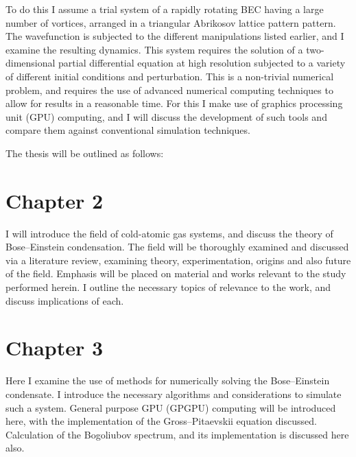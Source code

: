 To do this I assume a trial system of a rapidly rotating BEC having a large number of vortices, arranged in a triangular Abrikosov lattice pattern pattern. The wavefunction is subjected to the different manipulations listed earlier, and I examine the resulting dynamics. This system requires the solution of a two-dimensional partial differential equation at high resolution subjected to a variety of different initial conditions and perturbation. This is a non-trivial numerical problem, and requires the use of advanced numerical computing techniques to allow for results in a reasonable time. For this I make use of graphics processing unit (GPU) computing, and I will discuss the development of such tools and compare them against conventional simulation techniques.

The thesis will be outlined as follows:

\section{Chapter 2}
I will introduce the field of cold-atomic gas systems, and discuss the theory of Bose--Einstein condensation. The field will be thoroughly examined and discussed via a literature review, examining theory, experimentation, origins and also future of the field. Emphasis will be placed on material and works relevant to the study performed herein. I outline the necessary topics of relevance to the work, and discuss implications of each.

\iffalse
Introduction (~5-10 pages)

    - Thesis Statement (one or two sentences)
        What is your thesis about and what have you done?
        If you have a hypothesis what is it?
        How will you test (prove/disprove) your hypothesis?
    - Motivation
        Why is this problem you've worked on important
    - Goals / Objectives
        What are you trying to do and why?
        How will you or the reader know if or when you've met your objectives?
    - **** Contributions *****
        What is new, different, better, significant?
        Why is the world a better place because of what you've done?
        What have you contributed to the field of research?
        What is now known/possible/better because of your thesis?
    Outline of the thesis (optional)
\fi

\section{Chapter 3}
    Here I examine the use of methods for numerically solving the Bose--Einstein condensate. I introduce the necessary algorithms and considerations to simulate such a system. General purpose GPU (GPGPU) computing will be introduced here, with the implementation of the Gross--Pitaevskii equation discussed. Calculation of the Bogoliubov spectrum, and its implementation is discussed here also.

